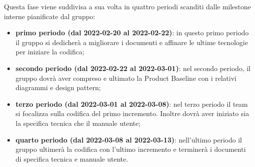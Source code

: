 Questa fase viene suddivisa a sua volta in quattro periodi scanditi dalle milestone interne pianificate dal gruppo:
\begin{itemize}
\item \textbf{primo periodo (dal 2022-02-20 al 2022-02-22)}: in questo primo periodo il gruppo si dedicherà a migliorare i documenti e affinare le ultime tecnologie per iniziare la codifica;
\item \textbf{secondo periodo (dal 2022-02-22 al 2022-03-01)}: nel secondo periodo,  il gruppo dovrà aver compreso e ultimato la Product Baseline con i relativi diagrammi e design pattern;
\item \textbf{terzo periodo (dal 2022-03-01 al 2022-03-08)}: nel terzo periodo il team si focalizza sulla codifica del primo incremento.  Inoltre dovrà aver iniziato sia la specifica tecnica che il manuale utente;
\item \textbf{quarto periodo (dal 2022-03-08 al 2022-03-13)}: nell'ultimo periodo il gruppo ultimerà la codifica con l’ultimo incremento e terminerà i documenti di specifica tecnica e manuale utente.
\end{itemize}